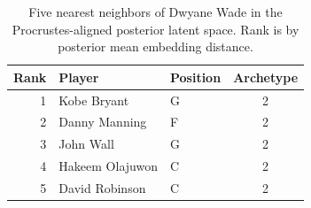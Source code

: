 \begin{table}[htbp]
  \centering\small
  \begin{tabular}{rllc}
    \toprule
    Rank & Player & Position & Archetype \\
    \midrule
    1 & Kobe Bryant & G & 2 \\
    2 & Danny Manning & F & 2 \\
    3 & John Wall & G & 2 \\
    4 & Hakeem Olajuwon & C & 2 \\
    5 & David Robinson & C & 2 \\
    \bottomrule
  \end{tabular}
  \caption{Five nearest neighbors of Dwyane Wade in the Procrustes-aligned posterior latent space. Rank is by posterior mean embedding distance.}
  \label{tab:Dwyane_Wade_neighbors}
\end{table}

